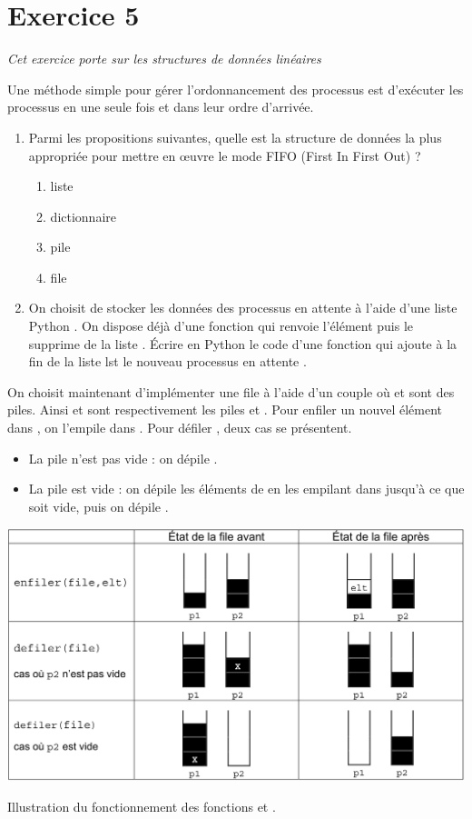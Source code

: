 \documentclass[11pt,a4paper,french,twoside]{PMCours}
\begin{document}
\newpage
\section*{Exercice 5}
\emph{Cet exercice porte sur les structures de données linéaires}

\medskip
Une méthode simple pour gérer l'ordonnancement des processus est d'exécuter les processus
en une seule fois et dans leur ordre d'arrivée.
\begin{enumerate}
\item Parmi les propositions suivantes, quelle est la structure de données la plus appropriée pour
mettre en œuvre le mode FIFO (First In First Out) ?
\begin{enumerate}
\item liste
\item dictionnaire
\item pile
\item file
\end{enumerate}
\item On choisit de stocker les données des processus en attente à l'aide d'une liste Python .
On dispose déjà d'une fonction  qui renvoie l'élément  puis le
supprime de la liste . Écrire en Python le code d'une fonction  qui
ajoute à la fin de la liste lst le nouveau processus en attente .
\end{enumerate}

On choisit maintenant d'implémenter une file  à l'aide d'un couple  où  et 
sont des piles. Ainsi  et  sont respectivement les piles  et .
Pour enfiler un nouvel élément  dans , on l'empile dans .
Pour défiler , deux cas se présentent.
\begin{itemize}
    \item La pile  n'est pas vide : on dépile .
    \item La pile  est vide : on dépile les éléments de  en les empilant dans  jusqu'à ce
    que  soit vide, puis on dépile .
\end{itemize}
\begin{center}
    \includegraphics[width=\textwidth]{BacBlanc2Sujet2_NSI2122-img1.png}
    
    Illustration du fonctionnement des fonctions  et .
\end{center}
\end{document}
